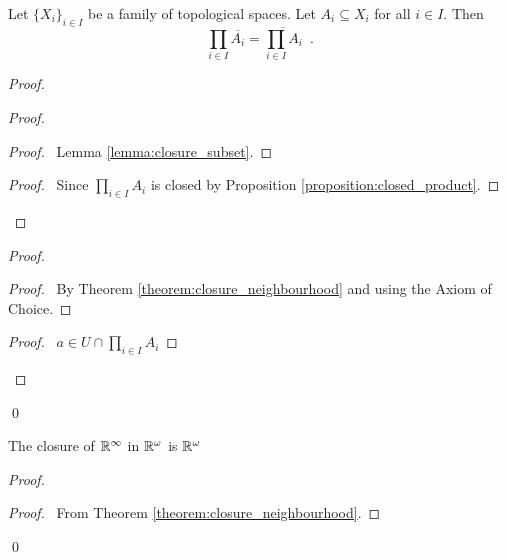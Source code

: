 \begin{proposition}[AC]
    Let $\{ X_i \}_{i \in I}$ be a family of topological spaces. Let $A_i \subseteq X_i$ for all $i \in I$.
    Then
    \[ \prod_{i \in I} \overline{A_i} = \overline{\prod_{i \in I} A_i} \enspace . \]
\end{proposition}

\begin{proof}
    \pf
    \begin{proof}
        \begin{proof}
            \pf\ Lemma \ref{lemma:closure_subset}.
        \end{proof}
        \qedstep
        \begin{proof}
            \pf\ Since $\prod_{i \in I} A_i$ is closed by Proposition \ref{proposition:closed_product}.
        \end{proof}
    \end{proof}
    \begin{proof}
        \begin{proof}
            \pf\ By Theorem \ref{theorem:closure_neighbourhood} and  using the Axiom of Choice.
        \end{proof}
        \qedstep
        \begin{proof}
            \pf\ $a \in U \cap \prod_{i \in I} A_i$
        \end{proof}
    \end{proof}
    \qed
\end{proof}

\begin{example}
    The closure of $\mathbb{R}^\infty$ in $\mathbb{R}^\omega$ is $\mathbb{R}^\omega$
\end{example}

\begin{proof}
    \pf
    \qedstep
    \begin{proof}
        \pf\ From Theorem \ref{theorem:closure_neighbourhood}.
    \end{proof}
    \qed
\end{proof}

